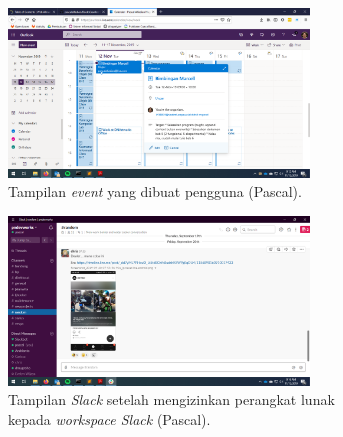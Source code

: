 \begin{figure}[h]
\begin{subfigure}{8.5cm}
  \centering
  \includegraphics[width=8cm]{./Gambar/PengujianPaPascal/Outlook.png}
  \caption{Tampilan \textit{event} yang dibuat pengguna (Pascal).}
  \label{fig:outlook_pascal}
\end{subfigure}
\begin{subfigure}{8.5cm}
  \centering
  \includegraphics[width=8cm]{./Gambar/PengujianPaPascal/Slack_After_Authorize_PL.png}
  \caption{Tampilan \textit{Slack} setelah mengizinkan perangkat lunak kepada \textit{workspace Slack} (Pascal).}
  \label{fig:slack_after_auth_pascal}
\end{subfigure}
\caption{}
\end{figure}

